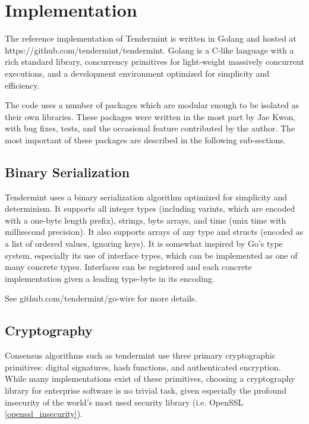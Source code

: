 \chapter{Implementation}
\label{ch:implementation}

The reference implementation of Tendermint is written in Golang \cite{golang} and hosted at https://github.com/tendermint/tendermint.
Golang is a C-like language with a rich standard library, concurrency primitives for light-weight massively concurrent executions,
and a development environment optimized for simplicity and efficiency.

The code uses a number of packages which are modular enough to be isolated as their own libraries.
These packages were written in the most part by Jae Kwon, with bug fixes, tests, and the occasional feature contributed by the author.
The most important of these packages are described in the following sub-sections.

\section{Binary Serialization}

Tendermint uses a binary serialization algorithm optimized for simplicity and determinism.
It supports all integer types (including varints, which are encoded with a one-byte length prefix),
strings, byte arrays, and time (unix time with millisecond precision).
It also supports arrays of any type and structs (encoded as a list of ordered values, ignoring keys).
It is somewhat inspired by Go's type system, especially its use of interface types, 
which can be implemented as one of many concrete types.
Interfaces can be registered and each concrete implementation given a leading type-byte in its encoding.

See github.com/tendermint/go-wire for more details.

\section{Cryptography}

Consensus algorithms such as tendermint use three primary cryptographic primitives: digital signatures, hash functions, and authenticated encryption.
While many implementations exist of these primitives, 
choosing a cryptography library for enterprise software is no trivial task, given especially the profound insecurity of the world's most used security library 
(i.e. OpenSSL \ref{openssl_insecurity}).

